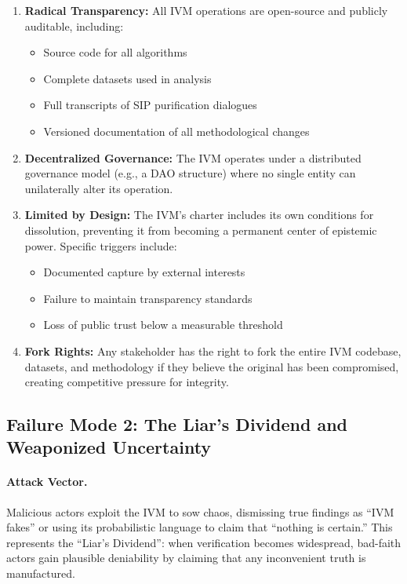 \documentclass[11pt,a4paper]{article}
\begin{document}
\begin{enumerate}
    \item \textbf{Radical Transparency:} All IVM operations are open-source and publicly auditable, including:
    \begin{itemize}
        \item Source code for all algorithms
        \item Complete datasets used in analysis
        \item Full transcripts of SIP purification dialogues
        \item Versioned documentation of all methodological changes
    \end{itemize}
    
    \item \textbf{Decentralized Governance:} The IVM operates under a distributed governance model (e.g., a DAO structure) where no single entity can unilaterally alter its operation.
    
    \item \textbf{Limited by Design:} The IVM's charter includes its own conditions for dissolution, preventing it from becoming a permanent center of epistemic power. Specific triggers include:
    \begin{itemize}
        \item Documented capture by external interests
        \item Failure to maintain transparency standards
        \item Loss of public trust below a measurable threshold
    \end{itemize}
    
    \item \textbf{Fork Rights:} Any stakeholder has the right to fork the entire IVM codebase, datasets, and methodology if they believe the original has been compromised, creating competitive pressure for integrity.
\end{enumerate}

\subsection{Failure Mode 2: The Liar's Dividend and Weaponized Uncertainty}

\paragraph{Attack Vector.} Malicious actors exploit the IVM to sow chaos, dismissing true findings as ``IVM fakes'' or using its probabilistic language to claim that ``nothing is certain.'' This represents the ``Liar's Dividend'': when verification becomes widespread, bad-faith actors gain plausible deniability by claiming that any inconvenient truth is manufactured.
\end{document}

